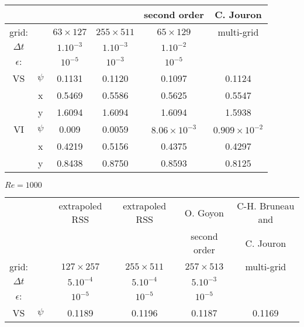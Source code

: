 \documentclass[11pt]{article}
\begin{document}
{\begin{table}[!h]
\begin{center}
\begin{tabular}{ |  c|c|c|c|c|c | }
                &             &                  &                  & second order              & C. Jouron \cite{BruneauJouron}\\ 
\hline 
grid:      &             & $63 \times 127$  & $255 \times 511$ & $65 \times 129$       & multi-grid \\ 
\hline 
$\Delta t$ &        &       $1.10^{-3}$                &            $1.10^{-3}$            &        $1.10^{-2}$                           & \\
\hline 
$\epsilon$:         &             & $10^{-5}$        & $10^{-3}$        &        $10^{-5}$               & \\ 
\hline 
VS              & $\psi$      & 0.1131           & 0.1120           & 0.1097                & 0.1124\\ 

                & x           & 0.5469           & 0.5586           & 0.5625                & 0.5547\\ 

                & y           & 1.6094           & 1.6094           & 1.6094                & 1.5938\\ 
\hline 
VI              & $\psi$      & 0.009            & 0.0059           & $8.06 \times 10^{-3}$ & $0.909 \times 10^{-2}$\\ 

                & x           & 0.4219           & 0.5156           & 0.4375                & 0.4297\\ 
                
                & y           & 0.8438           & 0.8750           & 0.8593                & 0.8125\\ 
\hline
\end{tabular} 

\vspace{0.5cm}


$Re=1000$

\begin{tabular}{|  c|c|c|c|c|c | }
\hline 
                &             &  extrapoled RSS    &  extrapoled RSS    & O. Goyon \cite{Goyon} & C-H. Bruneau and \\  

                &             &                  &                  & second order               & C. Jouron \cite{BruneauJouron}\\ 
\hline 
grid:      &             & $127 \times 257$ & $255 \times 511$ & $257 \times 513$      & multi-grid \\ 
\hline
$\Delta t$ &        &       $5.10^{-4}$                &            $5.10^{-4}$            &        $5.10^{-3}$                           & \\
\hline 
$\epsilon$:         &             & $10^{-5}$        & $10^{-5}$        &      $10^{-5}$                 & \\ 
\hline 
VS              & $\psi$      & 0.1189           &  0.1196          & 0.1187                & 0.1169\\ 


\end{tabular}
\end{center}
\end{table}}
\end{document}
